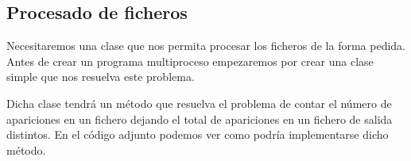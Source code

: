 \documentclass[letterpaper,10pt,spanish]{sphinxmanual}
\begin{document}
\subsection{Procesado de ficheros}
\label{\detokenize{textos/tema1:procesado-de-ficheros}}
Necesitaremos una clase  que nos permita procesar los ficheros de la forma pedida. Antes de crear un programa multiproceso empezaremos por crear una clase simple que nos resuelva este problema.

Dicha clase tendrá un método  que resuelva el problema de contar el número de apariciones en un fichero dejando el total de apariciones en un fichero de salida distintos. En el código adjunto podemos ver como podría implementarse dicho método.

%
\begin{sphinxVerbatim}[commandchars=\\\{\}]
   
        
        
       
       
        
          
     
\end{sphinxVerbatim}
\end{document}
